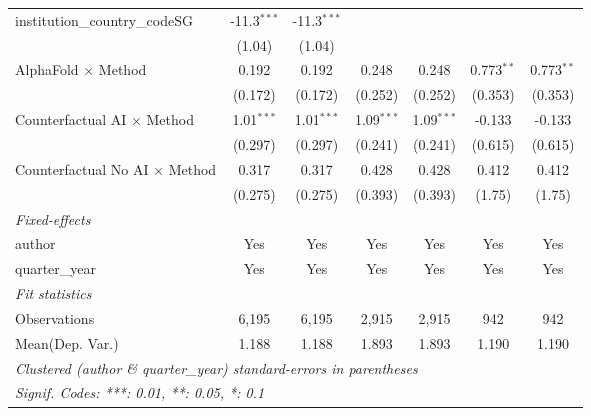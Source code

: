 \begin{tabular}{lcccccc}
   institution\_country\_codeSG          & -11.3$^{***}$ & -11.3$^{***}$ &               &               &               &   \\   
                                         & (1.04)        & (1.04)        &               &               &               &   \\   
   AlphaFold $\times$ Method             & 0.192         & 0.192         & 0.248         & 0.248         & 0.773$^{**}$  & 0.773$^{**}$\\   
                                         & (0.172)       & (0.172)       & (0.252)       & (0.252)       & (0.353)       & (0.353)\\   
   Counterfactual AI $\times$ Method     & 1.01$^{***}$  & 1.01$^{***}$  & 1.09$^{***}$  & 1.09$^{***}$  & -0.133        & -0.133\\   
                                         & (0.297)       & (0.297)       & (0.241)       & (0.241)       & (0.615)       & (0.615)\\   
   Counterfactual No AI $\times$ Method  & 0.317         & 0.317         & 0.428         & 0.428         & 0.412         & 0.412\\   
                                         & (0.275)       & (0.275)       & (0.393)       & (0.393)       & (1.75)        & (1.75)\\   
   \midrule
   \emph{Fixed-effects}\\
   author                                & Yes           & Yes           & Yes           & Yes           & Yes           & Yes\\  
   quarter\_year                         & Yes           & Yes           & Yes           & Yes           & Yes           & Yes\\  
   \midrule
   \emph{Fit statistics}\\
   Observations                          & 6,195         & 6,195         & 2,915         & 2,915         & 942           & 942\\  
Mean(Dep. Var.) & 1.188 & 1.188 & 1.893 & 1.893 & 1.190 & 1.190 \\
   \midrule \midrule
   \multicolumn{7}{l}{\emph{Clustered (author \& quarter\_year) standard-errors in parentheses}}\\
   \multicolumn{7}{l}{\emph{Signif. Codes: ***: 0.01, **: 0.05, *: 0.1}}\\
\end{tabular}
\par\endgroup
